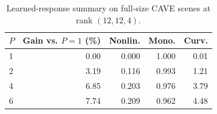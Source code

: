 \begin{table}[!t]
  \centering
  \caption{Learned-response summary on full-size CAVE scenes at rank $(12,12,4)$.}
  \label{tab:learned-response-mechanism}
  \scriptsize
  \begin{tabular}{@{}lrrrr@{}}
    \toprule
    $P$ & Gain vs. $P=1$ (\%) & Nonlin. & Mono. & Curv. \\
    \midrule
    1 & 0.00 & 0.000 & 1.000 & 0.01 \\
    2 & 3.19 & 0.116 & 0.993 & 1.21 \\
    4 & 6.85 & 0.203 & 0.976 & 3.79 \\
    6 & 7.74 & 0.209 & 0.962 & 4.48 \\
    \bottomrule
  \end{tabular}
\end{table}
